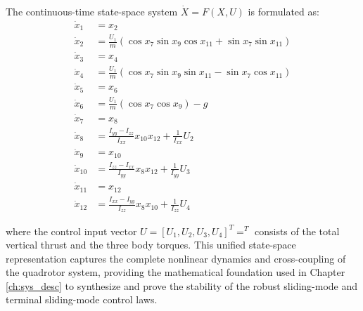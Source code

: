 The continuous-time state-space system $\dot{X} = F(X, U)$ is formulated as:
\begin{align}
\dot{x}_1 &= x_2 \\
\dot{x}_2 &= \frac{U_1}{m} (\cos x_7 \sin x_9 \cos x_{11} + \sin x_7 \sin x_{11}) \\
\dot{x}_3 &= x_4 \\
\dot{x}_4 &= \frac{U_1}{m} (\cos x_7 \sin x_9 \sin x_{11} - \sin x_7 \cos x_{11}) \\
\dot{x}_5 &= x_6 \\
\dot{x}_6 &= \frac{U_1}{m} (\cos x_7 \cos x_9) - g \\
\dot{x}_7 &= x_8 \\
\dot{x}_8 &= \frac{I_{yy} - I_{zz}}{I_{xx}} x_{10} x_{12} + \frac{1}{I_{xx}} U_2 \\
\dot{x}_9 &= x_{10} \\
\dot{x}_{10} &= \frac{I_{zz} - I_{xx}}{I_{yy}} x_8 x_{12} + \frac{1}{I_{yy}} U_3 \\
\dot{x}_{11} &= x_{12} \\
\dot{x}_{12} &= \frac{I_{xx} - I_{yy}}{I_{zz}} x_8 x_{10} + \frac{1}{I_{zz}} U_4
\end{align}

where the control input vector $U = [U_1, U_2, U_3, U_4]^T =^T$ consists of the total vertical thrust and the three body torques. This unified state-space representation captures the complete nonlinear dynamics and cross-coupling of the quadrotor system, providing the mathematical foundation used in Chapter \ref{ch:sys_desc} to synthesize and prove the stability of the robust sliding-mode and terminal sliding-mode control laws.

